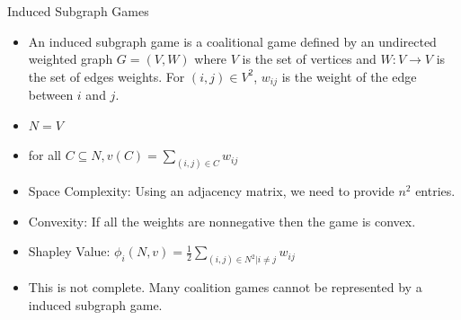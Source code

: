 \documentclass{beamer}
\begin{document}
\begin{frame}{Induced Subgraph Games}
    \begin{itemize}
        \item An induced subgraph game is a coalitional game defined by an undirected weighted graph $G = (V,W)$ where $V$ is the set of vertices and $W : V \rightarrow V$ is the set of edges weights. For $(i,j) \in V^2$, $w_{ij}$ is the weight of the edge between $i$ and $j$.
        \item $N = V$
        \item for all $C \subseteq N, v(C) = \sum_{(i,j) \in C} w_{ij}$
        \item {\color{blue}Space Complexity:} Using an adjacency matrix, we need to provide $n^2$ entries.
        \item {\color{blue}Convexity:} If all the weights are nonnegative then the game is convex.
        \item {\color{blue}Shapley Value:} $\phi_i(N,v) = \frac{1}{2} \sum_{(i,j) \in N^2 | i \neq j}w_{ij}$
        \item This is {\color{blue}not complete}. Many coalition games cannot be represented by a induced subgraph game.

    \end{itemize}
\end{frame}
\end{document}
